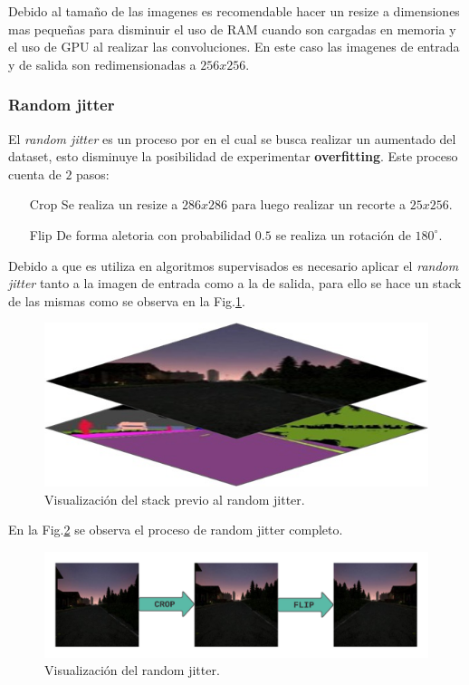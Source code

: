 \documentclass[]{IEEEtran}
\begin{document}
    Debido al tamaño de las imagenes es recomendable hacer un resize a dimensiones mas pequeñas 
    para disminuir el uso de RAM cuando son cargadas en memoria y el uso de GPU al realizar las convoluciones. En 
    este caso las imagenes de entrada y de salida son redimensionadas a $256x256$.

    \subsubsection{Random jitter}

    El \textit{random jitter} es un proceso por en el cual se busca realizar un aumentado
    del dataset, esto disminuye la posibilidad de experimentar \textbf{overfitting}. 
    Este proceso cuenta de $2$ pasos:

    \begin{itemize}
        \item[Crop] Se realiza un resize a $286x286$ para luego realizar un recorte a $25x256$.
        \item[Flip] De forma aletoria con probabilidad $0.5$ se realiza un rotación de $180^\circ$. 
    \end{itemize}

    Debido a que es utiliza en algoritmos supervisados es necesario aplicar 
    el \textit{random jitter} tanto a la imagen de entrada como a la de salida,
    para ello se hace un stack de las mismas como se observa en la Fig.\ref{fig:random-jitter}.

    \begin{figure}
        \centering
        \includegraphics[width=.4\textwidth]{Imgs/stack-random-jitter.jpeg}
        \caption{Visualización del stack previo al random jitter.}
        \label{fig:random-jitter}
    \end{figure}

    En la Fig.\ref{fig:crop-flip} se observa el proceso de random jitter completo.

    \begin{figure}
        \centering
        \includegraphics[width=.4\textwidth]{Imgs/in_crop_flip.png}
        \caption{Visualización del random jitter.}
        \label{fig:crop-flip}
    \end{figure}
\end{document}
